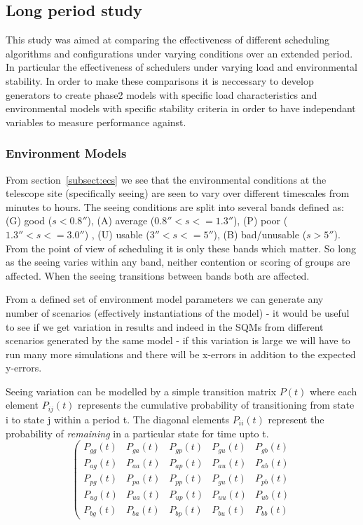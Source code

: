 \documentclass[12pt,a4paper]{article}
\begin{document}
{%
\subsection{Long period study}
\label{subsect:lts}
This study was aimed at comparing the effectiveness of different scheduling algorithms and configurations under varying conditions over an extended period. In particular the effectiveness of schedulers under varying load and environmental stability. In order to make these comparisons it is neccessary to develop generators to create phase2 models with specific load characteristics and environmental models with specific stability criteria in order to have independant variables to measure performance against.

\subsubsection{Environment Models}
From section~\ref{subsect:ecs} we see that the environmental conditions at the telescope site (specifically seeing) are seen to vary over different timescales from minutes to hours. The seeing conditions are split into several bands defined as: (G) good ($s < 0.8''$), (A) average ($0.8'' < s <= 1.3''$), (P) poor ($1.3'' < s <= 3.0''$) , (U) usable ($3'' < s <= 5''$), (B) bad/unusable ($s > 5''$). From the point of view of scheduling it is only these bands which matter. So long as the seeing varies within any band, neither contention or scoring of groups are affected. When the seeing transitions between bands both are affected. 

From a defined set of environment model parameters we can generate any number of scenarios (effectively instantiations of the model) - it would be useful to see if we get variation in results and indeed in the SQMs from different scenarios generated by the same model - if this variation is large we will have to run many more simulations and there will be x-errors in addition to the expected y-errors.

Seeing variation can be modelled by a simple transition matrix $P(t)$ where each element $P_{ij}(t)$ represents the cumulative probability of transitioning from state i to state j within a period t. The diagonal elements $P_{ii}(t)$ represent the probability of \emph{remaining} in a particular state for time upto t. 
\begin{equation}
 \left( 
\begin{array}{ccccc}
  P_{gg}(t) & P_{ga}(t) & P_{gp}(t) & P_{gu}(t) & P_{gb}(t)\\
  P_{ag}(t) & P_{aa}(t) & P_{ap}(t) & P_{au}(t) & P_{ab}(t)\\
  P_{pg}(t) & P_{pa}(t) & P_{pp}(t) & P_{gu}(t) & P_{pb}(t)\\
  P_{ug}(t) & P_{ua}(t) & P_{up}(t) & P_{uu}(t) & P_{ub}(t)\\
  P_{bg}(t) & P_{ba}(t) & P_{bp}(t) & P_{bu}(t) & P_{bb}(t)


\end{array}
\end{equation}}
\end{document}
